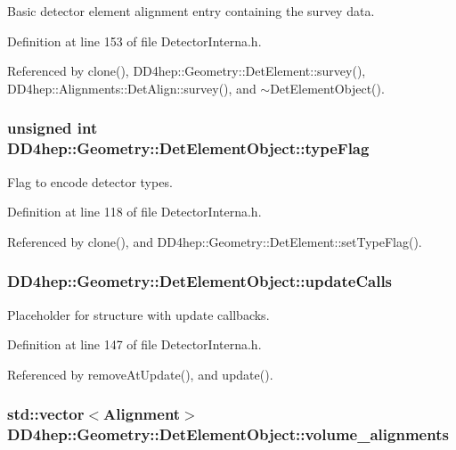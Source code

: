 Basic detector element alignment entry containing the survey data. 

Definition at line 153 of file DetectorInterna.h.

Referenced by clone(), DD4hep::Geometry::DetElement::survey(), DD4hep::Alignments::DetAlign::survey(), and $\sim$DetElementObject().\hypertarget{class_d_d4hep_1_1_geometry_1_1_det_element_object_a0038f8f124cb13a1cca03af95964dcf5}{
\subsubsection[{typeFlag}]{\setlength{\rightskip}{0pt plus 5cm}unsigned int {\bf DD4hep::Geometry::DetElementObject::typeFlag}}}
\label{class_d_d4hep_1_1_geometry_1_1_det_element_object_a0038f8f124cb13a1cca03af95964dcf5}


Flag to encode detector types. 

Definition at line 118 of file DetectorInterna.h.

Referenced by clone(), and DD4hep::Geometry::DetElement::setTypeFlag().\hypertarget{class_d_d4hep_1_1_geometry_1_1_det_element_object_a95a0d42e4b0410c815ba45eceb2e76a3}{
\subsubsection[{updateCalls}]{ {\bf DD4hep::Geometry::DetElementObject::updateCalls}}}
\label{class_d_d4hep_1_1_geometry_1_1_det_element_object_a95a0d42e4b0410c815ba45eceb2e76a3}


Placeholder for structure with update callbacks. 

Definition at line 147 of file DetectorInterna.h.

Referenced by removeAtUpdate(), and update().\hypertarget{class_d_d4hep_1_1_geometry_1_1_det_element_object_a549c814b4adf2d5897234ccd24186fb1}{
\subsubsection[{volume\_\-alignments}]{\setlength{\rightskip}{0pt plus 5cm}std::vector$<${\bf Alignment}$>$ {\bf DD4hep::Geometry::DetElementObject::volume\_\-alignments}}}
\label{class_d_d4hep_1_1_geometry_1_1_det_element_object_a549c814b4adf2d5897234ccd24186fb1}


